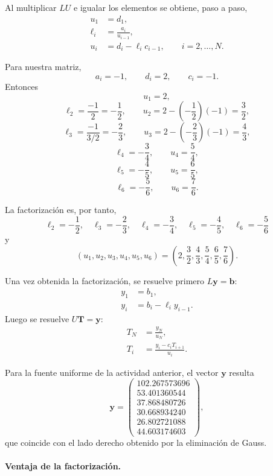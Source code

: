 \documentclass[11pt,a4paper]{article}
\begin{document}
Al multiplicar $LU$ e igualar los elementos se obtiene, paso a paso,
\begin{align}
 u_1&=d_1,\\
 \ell_i&=\frac{a_i}{u_{i-1}},\\
 u_i&=d_i-\ell_i c_{i-1},
\qquad i=2,\ldots,N.
\end{align}

Para nuestra matriz,
\[
a_i=-1,\qquad d_i=2,\qquad c_i=-1.
\]
Entonces
\[
u_1=2,
\]
\[
\ell_2=\frac{-1}{2}=-\frac12,
\qquad
u_2=2-\left(-\frac12\right)(-1)=\frac32,
\]
\[
\ell_3=\frac{-1}{3/2}=-\frac23,
\qquad
u_3=2-\left(-\frac23\right)(-1)=\frac43,
\]
\[
\ell_4=-\frac34,
\qquad u_4=\frac54,
\]
\[
\ell_5=-\frac45,
\qquad u_5=\frac65,
\]
\[
\ell_6=-\frac56,
\qquad u_6=\frac76.
\]

La factorización es, por tanto,
\begin{equation}
\boxed{
\ell_2=-\frac12,\quad
\ell_3=-\frac23,\quad
\ell_4=-\frac34,\quad
\ell_5=-\frac45,\quad
\ell_6=-\frac56
}
\end{equation}
y
\begin{equation}
\boxed{
(u_1,u_2,u_3,u_4,u_5,u_6)=
\left(2,\frac32,\frac43,\frac54,\frac65,\frac76\right).}
\end{equation}

Una vez obtenida la factorización, se resuelve primero $L\mathbf y=\mathbf b$:
\begin{align}
y_1&=b_1,\\
y_i&=b_i-\ell_i y_{i-1}.
\end{align}
Luego se resuelve $U\mathbf T=\mathbf y$:
\begin{align}
T_N&=\frac{y_N}{u_N},\\
T_i&=\frac{y_i-c_iT_{i+1}}{u_i}.
\end{align}

Para la fuente uniforme de la actividad anterior, el vector $\mathbf y$ resulta
\[
\mathbf y=
\begin{pmatrix}
102.267573696\\
53.401360544\\
37.868480726\\
30.668934240\\
26.802721088\\
44.603174603
\end{pmatrix},
\]
que coincide con el lado derecho obtenido por la eliminación de Gauss.

\paragraph{Ventaja de la factorización.}
\end{document}
